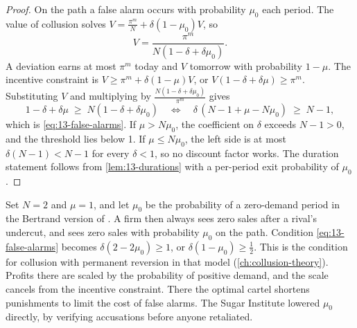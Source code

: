 \begin{proof}
On the path a false alarm occurs with probability $\mu_0$ each period. The value of collusion solves
$V = \frac{\pi^m}{N} + \delta(1 - \mu_0)V$, so
\begin{equation*}
  V = \frac{\pi^m}{N\left(1 - \delta + \delta\mu_0\right)} .
\end{equation*}
A deviation earns at most $\pi^m$ today and $V$ tomorrow with probability $1 - \mu$. The incentive constraint is
$V \ge \pi^m + \delta(1 - \mu)V$, or $V(1 - \delta + \delta\mu) \ge \pi^m$. Substituting $V$ and multiplying by
$\frac{N(1 - \delta + \delta\mu_0)}{\pi^m}$ gives
\begin{equation*}
  1 - \delta + \delta\mu \;\ge\; N\left(1 - \delta + \delta\mu_0\right)
  \quad\Longleftrightarrow\quad
  \delta\,(N - 1 + \mu - N\mu_0) \;\ge\; N - 1 ,
\end{equation*}
which is \eqref{eq:13-false-alarms}. If $\mu > N\mu_0$, the coefficient on $\delta$ exceeds $N - 1 > 0$, and the
threshold lies below 1. If $\mu \le N\mu_0$, the left side is at most $\delta(N-1) < N - 1$ for every
$\delta < 1$, so no discount factor works. The duration statement follows from \cref{lem:13-durations} with a
per-period exit probability of $\mu_0$.
\end{proof}

\begin{remark}\label{rem:13-gp-nesting}
Set $N = 2$ and $\mu = 1$, and let $\mu_0$ be the probability of a zero-demand period in the Bertrand version of
\citet{GreenPorter1984}. A firm then always sees zero sales after a rival's undercut, and sees zero sales with
probability $\mu_0$ on the path. Condition \eqref{eq:13-false-alarms} becomes $\delta(2 - 2\mu_0) \ge 1$, or
$\delta(1 - \mu_0) \ge \frac{1}{2}$. This is the condition for collusion with permanent reversion in that model
(\cref{ch:collusion-theory}). Profits there are scaled by the probability of positive demand, and the scale
cancels from the incentive constraint. There the optimal cartel shortens punishments to limit the cost of false alarms. The
Sugar Institute lowered $\mu_0$ directly, by verifying accusations before anyone retaliated.
\end{remark}

